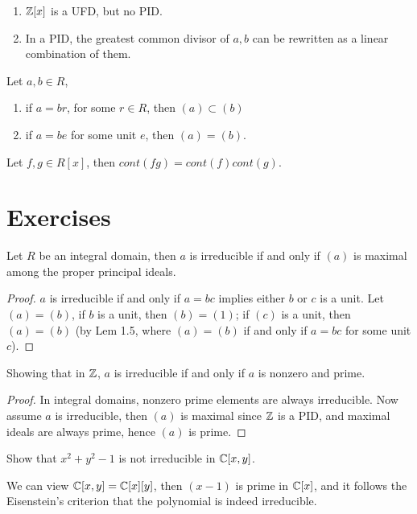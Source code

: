 \begin{prop}
    \begin{enumerate}
        \item $\mathbb{Z}[x]$ is a UFD, but no PID.
        \item In a PID, the greatest common divisor of $a,b$ can be rewritten as a linear combination of them.
    \end{enumerate}
\end{prop}


\begin{thm}
    Let $a,b\in R$,
    \begin{enumerate}
        \item if $a=br$, for some $r\in R$, then $(a)\subset(b)$
        \item if $a=be$ for some unit $e$, then $(a)=(b)$.
    \end{enumerate}
\end{thm}


\begin{thm}
    Let $f,g\in R[x]$, then $cont(fg)=cont(f)cont(g)$.
\end{thm}

\newpage
\section{Exercises}
\begin{exer}[1.12]
    Let $R$ be an integral domain, then $a$ is irreducible if and only if $(a)$ is maximal among the proper principal ideals.

    \begin{proof}
        $a$ is irreducible if and only if $a=bc$ implies either $b$ or $c$ is a unit. Let $(a)=(b)$, if $b$ is a unit, then $(b)=(1)$; if $(c)$ is a unit, then $(a)=(b)$ (by Lem 1.5, where $(a)=(b)$ if and only if $a=bc$ for some unit $c$).
    \end{proof}
\end{exer}
\begin{exer}[1.13]
    Showing that in $\mathbb{Z}$, $a$ is irreducible if and only if $a$ is nonzero and prime.

    \begin{proof}
        In integral domains, nonzero prime elements are always irreducible. Now assume $a$ is irreducible, then $(a)$ is maximal since $\mathbb{Z}$ is a PID, and maximal ideals are always prime, hence $(a)$ is prime. 
    \end{proof}
\end{exer}


\begin{example}
    Show that $x^2+y^2-1$ is not irreducible in $\mathbb{C}[x,y]$.

    We can view $\mathbb{C}[x,y]=\mathbb{C}[x][y]$, then $(x-1)$ is prime in $\mathbb{C}[x]$, and it follows the Eisenstein's criterion that the polynomial is indeed irreducible.
\end{example}




